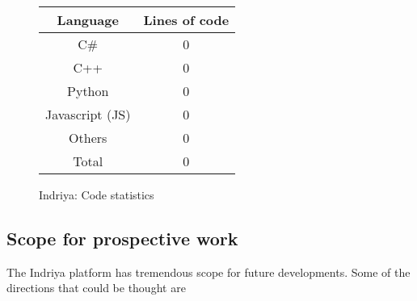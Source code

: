 \begin{figure}[!ht]
  \qquad
  \begin{tabular}[b]{cc}\hline
    Language & Lines of code \\ \hline
    C\# & 0 \\
    C++ & 0 \\
    Python & 0 \\
    Javascript (JS) & 0 \\
    Others & 0 \\
    Total & 0 \\ \hline
  \end{tabular}
  \caption{Indriya: Code statistics}
    \label{fig:code_stats}
\end{figure}

\subsection{Scope for prospective work}
  The Indriya platform has tremendous scope for future developments. Some of the directions that could be thought are

